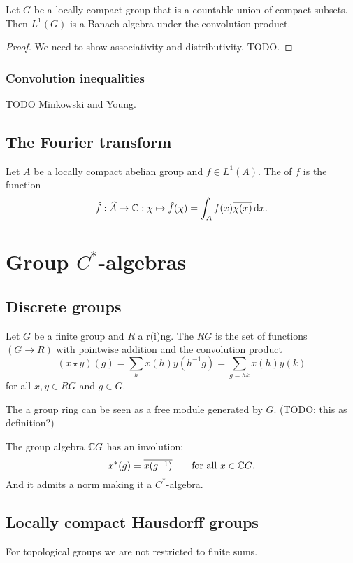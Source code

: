 \begin{proposition}
Let $G$ be a locally compact group that is a countable union of compact subsets. Then $L^1(G)$ is a Banach algebra under the convolution product.
\end{proposition}
\begin{proof}
We need to show associativity and distributivity. TODO.
\end{proof}

\subsubsection{Convolution inequalities}
TODO Minkowski and Young.

\subsection{The Fourier transform}
\begin{definition}
Let $A$ be a locally compact abelian group and $f\in L^1(A)$. The  of $f$ is the function
\[ \hat{f}: \widehat{A} \to \mathbb{C}: \chi \mapsto \hat{f}(\chi) = \int_A f(x)\overline{\chi(x)}\operatorname{d \!}{x}. \]
\end{definition}

\section{Group $C^*$-algebras}
\subsection{Discrete groups}
\begin{definition}
Let $G$ be a finite group and $R$ a r(i)ng. The  $RG$ is the set of functions $(G\to R)$ with pointwise addition and the convolution product
\[ (x\star y)(g) = \sum_h x(h)y(h^{-1}g) = \sum_{g=hk}x(h)y(k) \]
for all $x,y\in RG$ and $g\in G$. 
\end{definition}
The a group ring can be seen as a free module generated by $G$. (TODO: this as definition?)

The group algebra $\mathbb{C} G$ has an involution:
\[ x^*(g) = \overline{x(g^{-1})} \qquad \text{for all $x\in \mathbb{C} G$}. \]
And it admits a norm making it a $C^*$-algebra.

\subsection{Locally compact Hausdorff groups}
For topological groups we are not restricted to finite sums.

